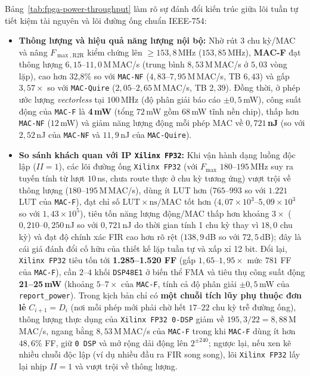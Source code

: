 Bảng~\ref{tab:fpga-power-throughput} làm rõ sự đánh đổi kiến trúc giữa lõi tuần
tự tiết kiệm tài nguyên và lõi đường ống chuẩn IEEE-754:
\begin{itemize}
  \item \textbf{Thông lượng và hiệu quả năng lượng nội bộ:} Nhờ rút 3 chu kỳ/MAC
        và nâng $F_{\max,\mathrm{R2R}}$ kiểm chứng lên $\ge 153{,}8$\,MHz ($153{,}85$\,MHz),
        \textbf{MAC-F} đạt thông lượng $6{,}15\text{--}11{,}0$\,M\,MAC/s (trung bình
        $8{,}53$\,M\,MAC/s ở $5{,}03$ vòng lặp), cao hơn 32,8\% so với \texttt{MAC-NF}
        ($4{,}83\text{--}7{,}95$\,M\,MAC/s, TB $6{,}43$) và gấp $3{,}57\times$ so với
        \texttt{MAC-Quire} ($2{,}05\text{--}2{,}65$\,M\,MAC/s, TB $2{,}39$). Đồng thời, ở phép
        ước lượng \textit{vectorless} tại $100$\,MHz
        (độ phân giải báo cáo $\pm 0{,}5$\,mW), công suất động của \texttt{MAC-F} là
        \textbf{4\,mW} (tổng $72$\,mW gồm $68$\,mW tĩnh nền chip), thấp hơn
        \texttt{MAC-NF} ($12$\,mW) và giảm năng lượng động mỗi phép MAC về
        \textbf{$0{,}721$\,nJ} (so với $2{,}52$\,nJ của \texttt{MAC-NF} và $11{,}9$\,nJ
        của \texttt{MAC-Quire}).
  \item \textbf{So sánh khách quan với IP \texttt{Xilinx FP32}:} Khi vận hành dạng
        luồng độc lập ($II=1$), các lõi đường ống \texttt{Xilinx FP32} (với
        $F_{\max}$ $180\text{--}195$\,MHz suy ra tuyến tính từ lượt $10$\,ns, chưa
        route thực ở chu kỳ tương ứng) vượt trội về thông lượng
        ($180\text{--}195$\,M\,MAC/s), dùng ít LUT hơn ($765\text{--}993$ so với
        $1.221$ LUT của \texttt{MAC-F}), đạt chỉ số $\mathrm{LUT}\times\mathrm{ns}/\mathrm{MAC}$
        tốt hơn ($4{,}07{\times}10^3\text{--}5{,}09{\times}10^3$ so với
        $1{,}43{\times}10^5$), tiêu tốn năng lượng động/MAC thấp hơn khoảng $3\times$
        ($0{,}210\text{--}0{,}250$\,nJ so với $0{,}721$\,nJ do thời gian tính 1 chu kỳ
        thay vì $18{,}0$ chu kỳ) và đạt độ chính xác FIR cao hơn rõ rệt
        ($138{,}9$\,dB so với $72{,}5$\,dB); đây là cái giá đánh đổi cố hữu của
        thiết kế lặp tuần tự và xấp xỉ 12 bit. Đổi lại, \texttt{Xilinx FP32} tiêu
        tốn tới \textbf{1.285--1.520 FF} (gấp $1{,}65\text{--}1{,}95\times$ mức $781$ FF
        của \texttt{MAC-F}), cần $2\text{--}4$ khối \texttt{DSP48E1} ở biến thể FMA
        và tiêu thụ công suất động \textbf{21--25\,mW} (khoảng $5\text{--}7\times$
        của \texttt{MAC-F}, tính cả độ phân giải $\pm 0{,}5$\,mW của \texttt{report\_power}).
        Trong kịch bản chỉ có \textbf{một chuỗi tích lũy phụ thuộc đơn lẻ}
        $C_{i+1}=D_i$ (nơi mỗi phép mới phải chờ hết $17\text{--}22$ chu kỳ trễ
        đường ống), thông lượng thực dụng của \texttt{Xilinx FP32 0-DSP} giảm về
        $195{,}3 / 22 = 8{,}88$\,M\,MAC/s, ngang bằng $8{,}53$\,M\,MAC/s của
        \texttt{MAC-F} trong khi \texttt{MAC-F} dùng ít hơn $48{,}6\%$ FF, giữ
        \texttt{0 DSP} và mở rộng dải động lên $2^{\pm 240}$; ngược lại, nếu xen
        kẽ nhiều chuỗi độc lập (ví dụ nhiều đầu ra FIR song song), lõi
        \texttt{Xilinx FP32} lấy lại nhịp $II=1$ và vượt trội về thông lượng.
\end{itemize}

